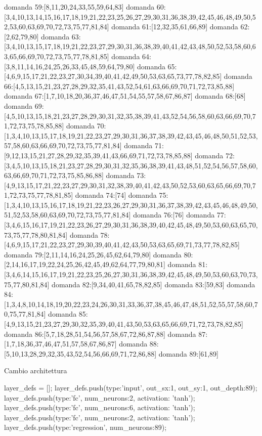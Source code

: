 domanda 59:[8,11,20,24,33,55,59,64,83]
domanda 60:[3,4,10,13,14,15,16,17,18,19,21,22,23,25,26,27,29,30,31,36,38,39,42,45,46,48,49,50,52,53,60,63,69,70,72,73,75,77,81,84]
domanda 61:[12,32,35,61,66,89]
domanda 62:[2,62,79,80]
domanda 63:[3,4,10,13,15,17,18,19,21,22,23,27,29,30,31,36,38,39,40,41,42,43,48,50,52,53,58,60,63,65,66,69,70,72,73,75,77,78,81,85]
domanda 64:[3,8,11,14,16,24,25,26,33,45,48,59,64,79,80]
domanda 65:[4,6,9,15,17,21,22,23,27,30,34,39,40,41,42,49,50,53,63,65,73,77,78,82,85]
domanda 66:[4,5,13,15,21,23,27,28,29,32,35,41,43,52,54,61,63,66,69,70,71,72,73,85,88]
domanda 67:[1,7,10,18,20,36,37,46,47,51,54,55,57,58,67,86,87]
domanda 68:[68]
domanda 69:[4,5,10,13,15,18,21,23,27,28,29,30,31,32,35,38,39,41,43,52,54,56,58,60,63,66,69,70,71,72,73,75,78,85,88]
domanda 70:[1,3,4,10,13,15,17,18,19,21,22,23,27,29,30,31,36,37,38,39,42,43,45,46,48,50,51,52,53,57,58,60,63,66,69,70,72,73,75,77,81,84]
domanda 71:[9,12,13,15,21,27,28,29,32,35,39,41,43,66,69,71,72,73,78,85,88]
domanda 72:[3,4,5,10,13,15,18,21,23,27,28,29,30,31,32,35,36,38,39,41,43,48,51,52,54,56,57,58,60,63,66,69,70,71,72,73,75,85,86,88]
domanda 73:[4,9,13,15,17,21,22,23,27,29,30,31,32,38,39,40,41,42,43,50,52,53,60,63,65,66,69,70,71,72,73,75,77,78,81,85]
domanda 74:[74]
domanda 75:[1,3,4,10,13,15,16,17,18,19,21,22,23,26,27,29,30,31,36,37,38,39,42,43,45,46,48,49,50,51,52,53,58,60,63,69,70,72,73,75,77,81,84]
domanda 76:[76]
domanda 77:[3,4,6,15,16,17,19,21,22,23,26,27,29,30,31,36,38,39,40,42,45,48,49,50,53,60,63,65,70,73,75,77,78,80,81,84]
domanda 78:[4,6,9,15,17,21,22,23,27,29,30,39,40,41,42,43,50,53,63,65,69,71,73,77,78,82,85]
domanda 79:[2,11,14,16,24,25,26,45,62,64,79,80]
domanda 80:[2,14,16,17,19,22,24,25,26,42,45,49,62,64,77,79,80,81]
domanda 81:[3,4,6,14,15,16,17,19,21,22,23,25,26,27,30,31,36,38,39,42,45,48,49,50,53,60,63,70,73,75,77,80,81,84]
domanda 82:[9,34,40,41,65,78,82,85]
domanda 83:[59,83]
domanda 84:[1,3,4,8,10,14,18,19,20,22,23,24,26,30,31,33,36,37,38,45,46,47,48,51,52,55,57,58,60,70,75,77,81,84]
domanda 85:[4,9,13,15,21,23,27,29,30,32,35,39,40,41,43,50,53,63,65,66,69,71,72,73,78,82,85]
domanda 86:[5,7,18,28,51,54,56,57,58,67,72,86,87,88]
domanda 87:[1,7,18,36,37,46,47,51,57,58,67,86,87]
domanda 88:[5,10,13,28,29,32,35,43,52,54,56,66,69,71,72,86,88]
domanda 89:[61,89]


Cambio architettura


layer_defs = [];
layer_defs.push({type:'input', out_sx:1, out_sy:1, out_depth:89});
layer_defs.push({type:'fc', num_neurons:2, activation: 'tanh'});
layer_defs.push({type:'fc', num_neurons:6, activation: 'tanh'});
layer_defs.push({type:'fc', num_neurons:2, activation: 'tanh'});
layer_defs.push({type:'regression', num_neurons:89});

